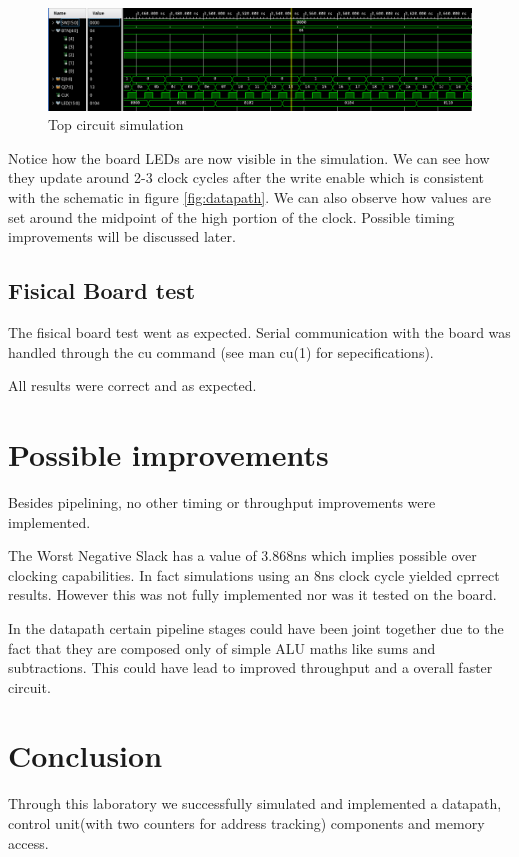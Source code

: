 \documentclass[12pt]{article}
\begin{document}
\begin{figure}[!htp]
	\centering
	\includegraphics[width=0.7\linewidth]{images/simTopCircuit.png}
	\caption{Top circuit simulation}
	\label{fig:simTopCircuit}
\end{figure}

Notice how the board LEDs are now visible in the simulation. We can see how they update around 2-3 clock cycles after the write enable which is consistent with the schematic in figure \ref{fig:datapath}.
We can also observe how values are set around the midpoint of the high portion of the clock. Possible timing improvements will be discussed later.

\subsection{Fisical Board test}
The fisical board test went as expected.
Serial communication with the board was handled through the cu command (see man cu(1) for sepecifications).

All results were correct and as expected.

\section{Possible improvements}
Besides pipelining, no other timing or throughput improvements were implemented.

The Worst Negative Slack has a value of 3.868ns which implies possible over clocking capabilities. In fact simulations using an 8ns clock cycle yielded cprrect results. However this was not fully implemented nor was it tested on the board.

In the datapath certain pipeline stages could have been joint together due to the fact that they are composed only of simple ALU maths like sums and subtractions. This could have lead to improved throughput and a overall faster circuit.

\section{Conclusion}
Through this laboratory we successfully simulated and implemented a datapath, control unit(with two counters for address tracking) components and memory access.
\end{document}
